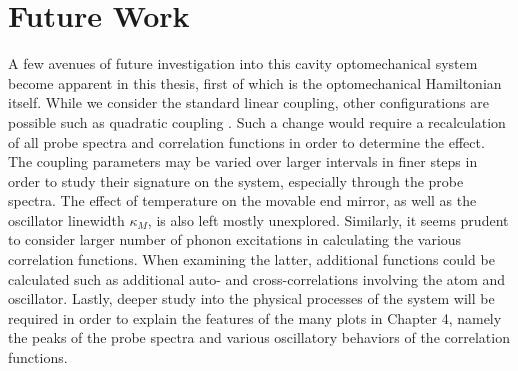 \section{Future Work}
A few avenues of future investigation into this cavity optomechanical system become apparent in this thesis, first of which is the optomechanical Hamiltonian itself. While we consider the standard linear coupling, other configurations are possible such as quadratic coupling \cite{li2012, agarwal2011}. Such a change would require a recalculation of all probe spectra and correlation functions in order to determine the effect. The coupling parameters may be varied over larger intervals in finer steps in order to study their signature on the system, especially through the probe spectra. The effect of temperature on the movable end mirror, as well as the oscillator linewidth $\kappa_M$, is also left mostly unexplored. Similarly, it seems prudent to consider larger number of phonon excitations in calculating the various correlation functions. When examining the latter, additional functions could be calculated such as additional auto- and cross-correlations involving the atom and oscillator. Lastly, deeper study into the physical processes of the system will be required in order to explain the features of the many plots in Chapter 4, namely the peaks of the probe spectra and various oscillatory behaviors of the correlation functions.